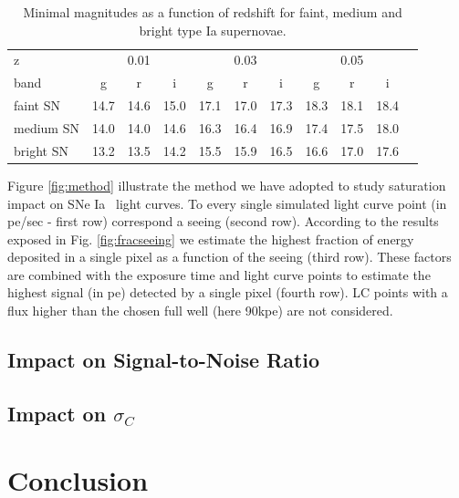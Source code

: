 \documentclass[\docopts]{\docclass}
\newcommand{\sne}{{SNe Ia }}
\begin{document}
\begin{table}[!htbp]
  \caption{Minimal magnitudes as a function of redshift for faint, medium and bright type Ia supernovae.}\label{tab:minimag}
  \begin{center}
    \begin{tabular}{l|ccc|ccc|cccc}
      \hline
      \hline
      z        &\multicolumn{3}{c}{0.01} & \multicolumn{3}{c}{0.03} & \multicolumn{3}{c}{0.05} \\
      band & g & r & i & g & r & i & g & r &i \\
      \hline
      \hline
      faint SN   & 14.7 & 14.6 & 15.0 & 17.1 & 17.0 & 17.3 & 18.3 & 18.1 & 18.4 \\
      medium SN  & 14.0 & 14.0 & 14.6 & 16.3 & 16.4 & 16.9 & 17.4 & 17.5 & 18.0 \\
      bright SN & 13.2 & 13.5 & 14.2 & 15.5 & 15.9 & 16.5 & 16.6 & 17.0 & 17.6\\
      \hline
    \end{tabular}
  \end{center}
  \end{table}

Figure \ref{fig:method} illustrate the method we have adopted to study saturation impact on \sne~light curves. To every single simulated light curve point (in pe/sec - first row) correspond a seeing (second row). According to the results exposed in Fig. \ref{fig:fracseeing} we estimate the highest fraction of energy deposited in a single pixel as a function of the seeing (third row). These factors are combined with the exposure time and  light curve points to estimate the highest signal (in pe) detected by a single pixel (fourth row). LC points with a flux higher than the chosen full well (here 90kpe) are not considered.

\subsection{Impact on Signal-to-Noise Ratio}

\subsection{Impact on $\sigma_C$}


\section{Conclusion}
\label{sec:conclusion}
\end{document}
